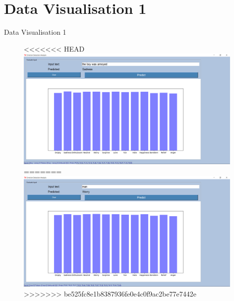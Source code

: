 \documentclass{beamer}
\begin{document}
\section{Data Visualisation 1}
\begin{frame}{Data Visualisation 1}
\begin{figure}[H]
\centering
<<<<<<< HEAD
\includegraphics[width=110mm]{DV3.png}
=======
\includegraphics[width=110mm]{DV1.png}
>>>>>>> be525fc8e1b8387936fe0e4c0f9ac2be77e7442e
\end{figure}
\end{frame}
\end{document}
